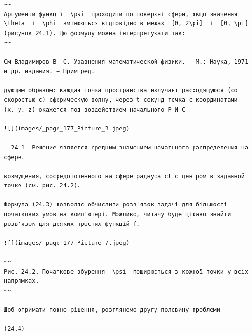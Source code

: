 \documentclass[
  ukrainian,
]{article}
\begin{document}
\begin{verbatim}
~~
Аргументи функції  \psi  проходити по поверхні сфери, якщо значення  \theta  і  \phi  змінюються відповідно в межах  [0, 2\pi]  і  [0, \pi]  (рисунок 24.1). Цю формулу можна інтерпретувати так:
~~

См Владимиров В. С. Уравнения математической физики. — М.: Наука, 1971 и др. издания. — Прим ред.

дующим образом: каждая точка пространства излучает расходящуюся (со скоростью c) сферическую волну, через t секунд точка с координатами (x, y, z) окажется под воздействием начального Р И С

![](images/_page_177_Picture_3.jpeg)

. 24 1. Решение является средним значением начатьного распределения на сфере.

возмущения, сосредоточенного на сфере раднуса ct с центром в заданной точке (см. рис. 24.2).

Формула (24.3) дозволяє обчислити розв'язок задачі для більшості початкових умов на комп'ютері. Можливо, читачу буде цікаво знайти розв'язок для деяких простих функцій f.

![](images/_page_177_Picture_7.jpeg)

~~
Рис. 24.2. Початкове збурення  \psi  поширюється з кожної точки у всіх напрямках.
~~

Щоб отримати повне рішення, розглянемо другу половину проблеми

(24.4)
\end{verbatim}
\end{document}
